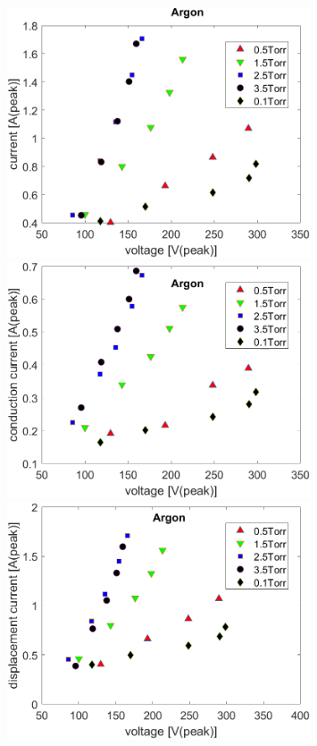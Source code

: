 \documentclass[12pt]{iopart}
\begin{document}
\begin{figure}[ht!]
\begin{center}
\begin{minipage}{0.495\textwidth}
    \includegraphics[width=0.8\textwidth]{Ar_current_volts.png}
\end{minipage}
\begin{minipage}{0.495\textwidth}
    \includegraphics[width=0.8\textwidth]{Ar_conduction_volts.png}
\end{minipage}
\begin{minipage}{0.495\textwidth}
    \includegraphics[width=0.8\textwidth]{Ar_disp_volts.png}

\end{minipage}
\end{center}
\end{figure}
\end{document}
